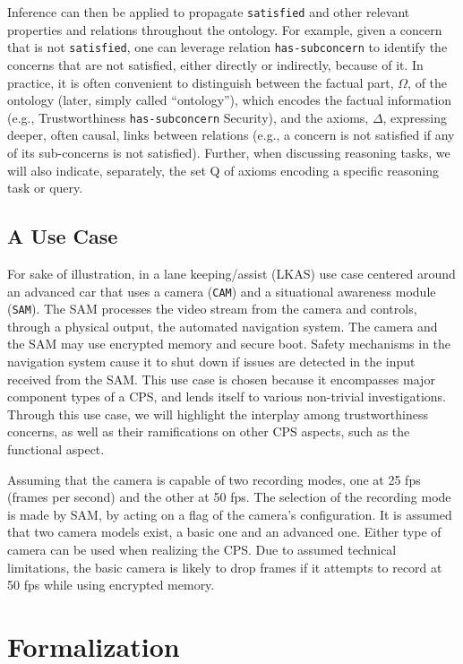 Inference can then be applied to propagate  {\tt satisfied} and other relevant properties and relations throughout the ontology. For example, given a concern that is not  {\tt satisfied}, one can leverage relation {\tt has-subconcern} to identify the concerns that are not satisfied, either directly or indirectly, because of it.
In practice, it is often convenient to distinguish between the factual part, $\Omega$, of the ontology (later, simply called ``ontology''), which encodes the factual information (e.g., Trustworthiness {\tt has-subconcern} Security), and the axioms, $\Delta$, expressing deeper, often causal, links between relations (e.g., a concern is not satisfied if any of its sub-concerns is not satisfied). Further, when discussing reasoning tasks, we will also indicate, separately, the set Q of axioms encoding a specific reasoning task or query.
%
\subsection{A Use Case}
\label{use_case}
%
For sake of illustration, in a lane keeping/assist (LKAS) use case centered around an advanced car that uses a camera ({\tt CAM}) and a situational awareness module ({\tt SAM}). The SAM processes the video stream from the camera and controls, through a physical output, the automated navigation system. The camera and the SAM may use encrypted memory and secure boot. Safety mechanisms in the navigation system cause it to shut down if issues are detected in the input received from the SAM. This use case is chosen because it encompasses major component types of a CPS, and lends itself to various non-trivial investigations. Through this use case, we will highlight the interplay among trustworthiness concerns, as well as their ramifications on other CPS aspects, such as the functional aspect.

Assuming that the camera is capable of two recording modes, one at 25 fps (frames per second) and the other at 50 fps. The selection of the recording mode is made by SAM, by acting on a flag of the camera's configuration. It is assumed that two camera models exist, a basic one and an advanced one. Either type of camera can be used when realizing the CPS. Due to assumed technical limitations, the basic camera is likely to drop frames if it attempts to record at 50 fps while using encrypted memory.
%


\section{Formalization}

